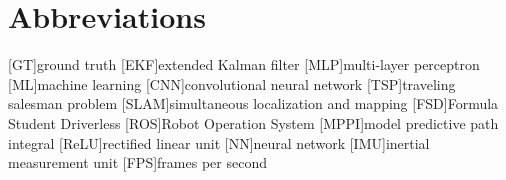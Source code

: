 \chapter{Abbreviations}

\begin{acronym}[AAPC]
	[GT]{ground truth}
	[EKF]{extended Kalman filter}
	[MLP]{multi-layer perceptron}
	[ML]{machine learning}
	[CNN]{convolutional neural network}
	[TSP]{traveling salesman problem} 
	[SLAM]{simultaneous localization and mapping}
	[FSD]{Formula Student Driverless}
	[ROS]{Robot Operation System}
	[MPPI]{model predictive path integral}
	[ReLU]{rectified linear unit}
	[NN]{neural network}
	[IMU]{inertial measurement unit}
	[FPS]{frames per second}

\end{acronym}